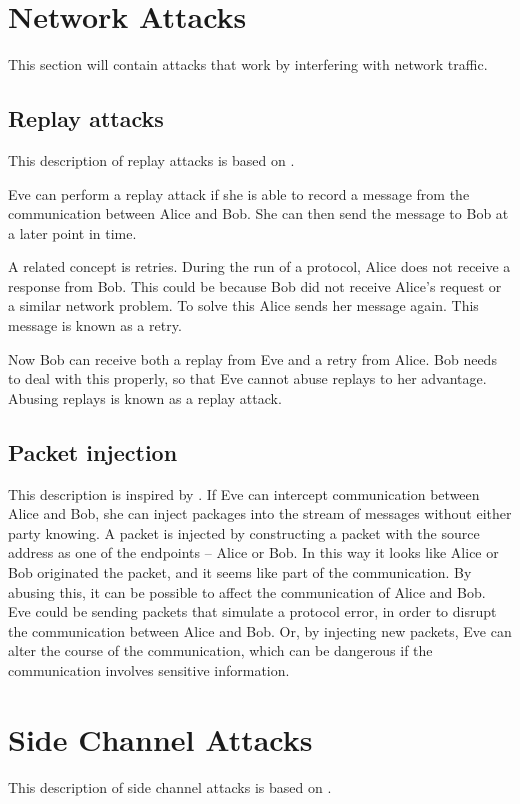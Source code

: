 \section{Network Attacks}\label{attacks}

This section will contain attacks that work by interfering with network traffic.

\subsection{Replay attacks}\label{replay_attack}
This description of replay attacks is based on \citet[p.~223]{cryptoenginering}.

Eve can perform a replay attack if she is able to record a message from the communication between Alice and Bob.
She can then send the message to Bob at a later point in time. 

A related concept is retries.
During the run of a protocol, Alice does not receive a response from Bob.
This could be because Bob did not receive Alice's request or a similar network problem.
To solve this Alice sends her message again.
This message is known as a retry.

Now Bob can receive both a replay from Eve and a retry from Alice.
Bob needs to deal with this properly, so that Eve cannot abuse replays to her advantage.
Abusing replays is known as a replay attack.

\subsection{Packet injection}\label{attack:packet}
This description is inspired by \citet{packetinjection}.
If Eve can intercept communication between Alice and Bob, she can inject packages into the stream of messages without either party knowing.
A packet is injected by constructing a packet with the source address as one of the endpoints -- Alice or Bob.
In this way it looks like Alice or Bob originated the packet, and it seems like part of the communication.
By abusing this, it can be possible to affect the communication of Alice and Bob.
Eve could be sending packets that simulate a protocol error, in order to disrupt the communication between Alice and Bob.
Or, by injecting new packets, Eve can alter the course of the communication, which can be dangerous if the communication involves sensitive information.

\section{Side Channel Attacks}\label{attack:sidechannel}
This description of side channel attacks is based on \citet[p.~132]{cryptoenginering}.


